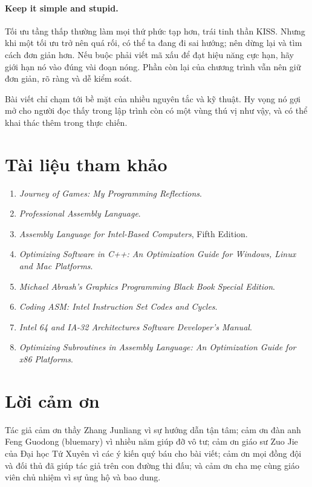 \documentclass[11pt]{article}
\begin{document}
\paragraph{Keep it simple and stupid.}
Tối ưu tầng thấp thường làm mọi thứ phức tạp hơn, trái tinh thần KISS. Nhưng
khi một tối ưu trở nên quá rối, có thể ta đang đi sai hướng; nên dừng lại và
tìm cách đơn giản hơn. Nếu buộc phải viết mã xấu để đạt hiệu năng cực hạn,
hãy giới hạn nó vào đúng vài đoạn nóng. Phần còn lại của chương trình vẫn nên
giữ đơn giản, rõ ràng và dễ kiểm soát.

Bài viết chỉ chạm tới bề mặt của nhiều nguyên tắc và kỹ thuật. Hy vọng nó gợi
mở cho người đọc thấy trong lập trình còn có một vùng thú vị như vậy, và có
thể khai thác thêm trong thực chiến.

\section{Tài liệu tham khảo}

\begin{enumerate}
  \item \textit{Journey of Games: My Programming Reflections}.
  \item \textit{Professional Assembly Language}.
  \item \textit{Assembly Language for Intel-Based Computers}, Fifth Edition.
  \item \textit{Optimizing Software in C++: An Optimization Guide for
  Windows, Linux and Mac Platforms}.
  \item \textit{Michael Abrash's Graphics Programming Black Book Special
  Edition}.
  \item \textit{Coding ASM: Intel Instruction Set Codes and Cycles}.
  \item \textit{Intel 64 and IA-32 Architectures Software Developer's Manual}.
  \item \textit{Optimizing Subroutines in Assembly Language: An Optimization
  Guide for x86 Platforms}.
\end{enumerate}

\section{Lời cảm ơn}

Tác giả cảm ơn thầy Zhang Junliang vì sự hướng dẫn tận tâm; cảm ơn đàn anh
Feng Guodong (bluemary) vì nhiều năm giúp đỡ vô tư; cảm ơn giáo sư Zuo Jie
của Đại học Tứ Xuyên vì các ý kiến quý báu cho bài viết; cảm ơn mọi đồng đội
và đối thủ đã giúp tác giả trên con đường thi đấu; và cảm ơn cha mẹ cùng giáo
viên chủ nhiệm vì sự ủng hộ và bao dung.
\end{document}
